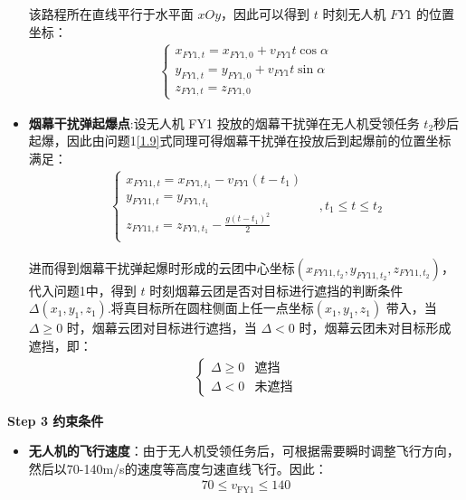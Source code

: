 \documentclass[../main.tex]{subfiles}
\begin{document}
\begin{itemize}
\par 该路程所在直线平行于水平面 \( xOy \)，因此可以得到 \( t \) 时刻无人机 \( FY1 \) 的位置坐标：
\begin{align}\label{10.3}
\begin{cases}
x_{FY1,t} = x_{FY1,0} + v_{FY1} t \cos\alpha \\
y_{FY1,t} = y_{FY1,0} + v_{FY1} t \sin\alpha \\
z_{FY1,t} = z_{FY1,0}
\end{cases}
\end{align}
\item \textbf{烟幕干扰弹起爆点}:设无人机 FY1 投放的烟幕干扰弹在无人机受领任务 \( t_2 \)秒后起爆，因此由问题1\eqref{1.9}式同理可得烟幕干扰弹在投放后到起爆前的位置坐标满足：
\begin{align}\label{10.4}
    \begin{cases}
x_{FY11,t}=x_{FY1,t_1}-v_{FY1}\left( t-t_1 \right)\\
	y_{FY11,t}=y_{FY1,t_1}\\
	z_{FY11,t}=z_{FY1,t_1}-\frac{g\left( t-t_1 \right) ^2}{2}\\
\end{cases}
\quad, t_1 \leq t \leq t_2
\end{align}
\par 进而得到烟幕干扰弹起爆时形成的云团中心坐标$\left( x_{FY11,t_2},y_{FY11,t_2},z_{FY11,t_2} \right)$，代入问题1中，得到 $t$ 时刻烟幕云团是否对目标进行遮挡的判断条件$\Delta \left( x_1,y_1,z_1 \right) $.将真目标所在圆柱侧面上任一点坐标$(x_1, y_1, z_1)$ 带入，当 $\Delta \geq 0$ 时，烟幕云团对目标进行遮挡，当 $\Delta < 0$ 时，烟幕云团未对目标形成遮挡，即：
\begin{align}
\begin{cases}
\Delta \geq 0 & \text{遮挡} \\
\Delta < 0 & \text{未遮挡}
\end{cases}
\end{align}\label{10.7}
\end{itemize}

\textbf{Step 3 约束条件}
\begin{itemize}
\item \textbf{无人机的飞行速度}：由于无人机受领任务后，可根据需要瞬时调整飞行方向，然后以70-140m/s的速度等高度匀速直线飞行。因此：
\begin{align}\label{10.8}
  70 \leq v_{\text{FY1}} \leq 140
\end{align}
\end{itemize}
\end{document}
